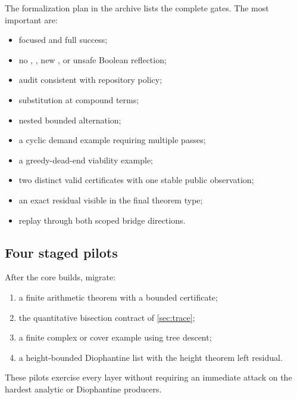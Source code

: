 The formalization plan in the archive lists the complete gates.  The most important are:

\begin{itemize}
\item focused and full  success;
\item no , , new , or unsafe Boolean reflection;
\item {} audit consistent with repository policy;
\item substitution at compound terms;
\item nested bounded alternation;
\item a cyclic demand example requiring multiple passes;
\item a greedy-dead-end viability example;
\item two distinct valid certificates with one stable public observation;
\item an exact residual visible in the final theorem type;
\item replay through both scoped bridge directions.
\end{itemize}

\subsection{Four staged pilots}

After the core builds, migrate:

\begin{enumerate}
\item a finite arithmetic theorem with a bounded certificate;
\item the quantitative bisection contract of \cref{sec:trace};
\item a finite complex or cover example using tree descent;
\item a height-bounded Diophantine list with the height theorem left residual.
\end{enumerate}

These pilots exercise every layer without requiring an immediate attack on the hardest analytic or Diophantine producers.
